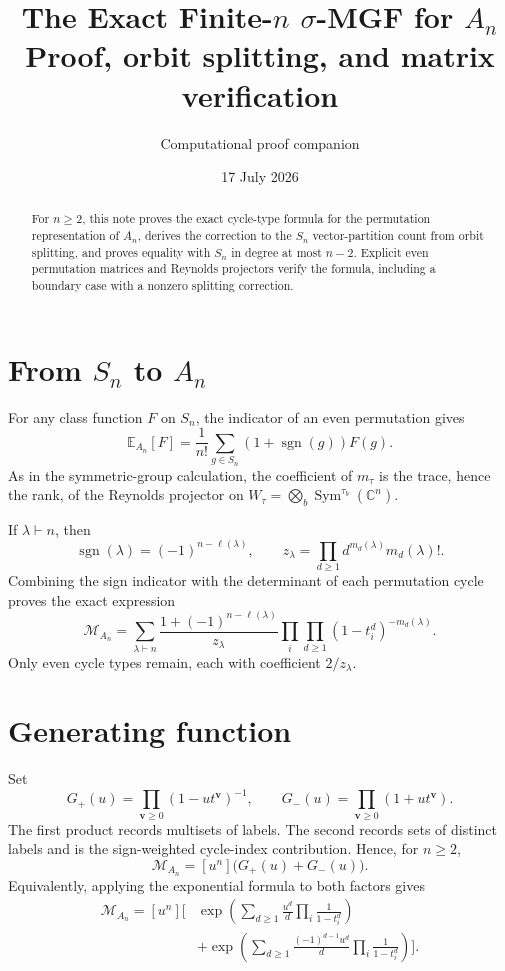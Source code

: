 \documentclass[10pt]{article}
\title{\color{navy}\textbf{The Exact Finite-$n$ $\sigma$-MGF for $A_n$}\\[2mm]
\large Proof, orbit splitting, and matrix verification}
\author{Computational proof companion}
\date{17 July 2026}
\newcommand{\Sym}{\operatorname{Sym}}
\newcommand{\M}{\mathcal M}
\begin{document}
\maketitle
\begin{abstract}
For $n\ge2$, this note proves the exact cycle-type formula for the permutation
representation of $A_n$, derives the correction to the $S_n$ vector-partition
count from orbit splitting, and proves equality with $S_n$ in degree at most
$n-2$.  Explicit even permutation matrices and Reynolds projectors verify the
formula, including a boundary case with a nonzero splitting correction.
\end{abstract}

\section{From \texorpdfstring{$S_n$}{S-n} to \texorpdfstring{$A_n$}{A-n}}
For any class function $F$ on $S_n$, the indicator of an even permutation gives
\[
 \mathbb E_{A_n}[F]=\frac1{n!}\sum_{g\in S_n}(1+\operatorname{sgn}(g))F(g).
\]
As in the symmetric-group calculation, the coefficient of $m_\tau$ is the
trace, hence the rank, of the Reynolds projector on
$W_\tau=\bigotimes_b\Sym^{\tau_b}(\mathbb C^n)$.

If $\lambda\vdash n$, then
\[
 \operatorname{sgn}(\lambda)=(-1)^{n-\ell(\lambda)},\qquad
 z_\lambda=\prod_{d\ge1}d^{m_d(\lambda)}m_d(\lambda)!.
\]
Combining the sign indicator with the determinant of each permutation cycle
proves the exact expression
\[
 \boxed{\M_{A_n}=\sum_{\lambda\vdash n}
 \frac{1+(-1)^{n-\ell(\lambda)}}{z_\lambda}
 \prod_i\prod_{d\ge1}(1-t_i^d)^{-m_d(\lambda)}.}
\]
Only even cycle types remain, each with coefficient $2/z_\lambda$.

\section{Generating function}
Set
\[
 G_+(u)=\prod_{\mathbf v\ge0}(1-ut^{\mathbf v})^{-1},\qquad
 G_-(u)=\prod_{\mathbf v\ge0}(1+ut^{\mathbf v}).
\]
The first product records multisets of labels.  The second records sets of
distinct labels and is the sign-weighted cycle-index contribution.  Hence, for
$n\ge2$,
\[
 \boxed{\M_{A_n}=[u^n]\bigl(G_+(u)+G_-(u)\bigr).}
\]
Equivalently, applying the exponential formula to both factors gives
\begin{align*}
\M_{A_n}=[u^n]\Bigg[&\exp\left(\sum_{d\ge1}\frac{u^d}{d}
 \prod_i\frac1{1-t_i^d}\right)\\
&+\exp\left(\sum_{d\ge1}\frac{(-1)^{d-1}u^d}{d}
 \prod_i\frac1{1-t_i^d}\right)\Bigg].
\end{align*}
\end{document}
